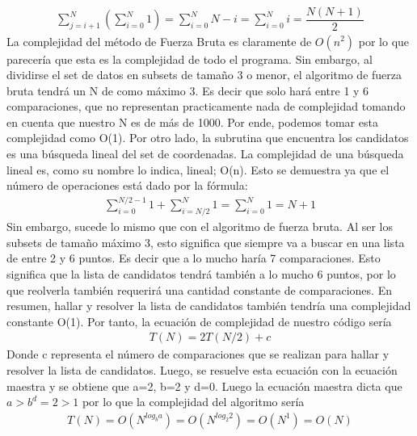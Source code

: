 \begin{align*}
    \sum_{j=i+1}^{N}{\left(
        \sum_{i=0}^{N}{1}
    \right)} =  \sum_{i=0}^{N}{N-i} = \sum_{i=0}^{N}{i} = \dfrac{N(N+1)}{2}
\end{align*}
La complejidad del método de Fuerza Bruta es claramente de $O(n^2)$ por lo que parecería que esta es la complejidad de todo el programa. Sin embargo, al dividirse el set de datos en subsets de tamaño 3 o menor, el algoritmo de fuerza bruta tendrá un N de como máximo 3. Es decir que solo hará entre 1 y 6 comparaciones, que no representan practicamente nada de complejidad tomando en cuenta que nuestro N es de más de 1000. Por ende, podemos tomar esta complejidad como O(1). Por otro lado, la subrutina que encuentra los candidatos es una búsqueda lineal del set de coordenadas. La complejidad de una búsqueda lineal es, como su nombre lo indica, lineal; O(n). Esto se demuestra ya que el número de operaciones está dado por la fórmula:
\begin{align*}
    \sum_{i=0}^{N/2-1}{1} + \sum_{i=N/2}^{N}{1} =  \sum_{i=0}^{N}{1} = N+1
\end{align*}
Sin embargo, sucede lo mismo que con el algoritmo de fuerza bruta. Al ser los subsets de tamaño máximo 3, esto significa que siempre va a buscar en una lista de entre 2 y 6 puntos. Es decir que a lo mucho haría 7 comparaciones. Esto significa que la lista de candidatos tendrá también a lo mucho 6 puntos, por lo que reolverla también requerirá una cantidad constante de comparaciones. En resumen, hallar y resolver la lista de candidatos también tendría una complejidad constante O(1). Por tanto, la ecuación de complejidad de nuestro código sería 
\begin{align*}
    T(N) = 2T(N/2) + c
\end{align*}
Donde c representa el número de comparaciones que se realizan para hallar y resolver la lista de candidatos. Luego, se resuelve esta ecuación con la ecuación maestra y se
obtiene que a=2, b=2 y d=0. Luego la ecuación maestra dicta que $a > b^d = 2 > 1$ por lo que la complejidad del algoritmo sería 
\begin{align*}
    T(N) = O(N^{log_b a}) = O(N^{log_2 2}) = O(N^1) = O(N)
\end{align*}


